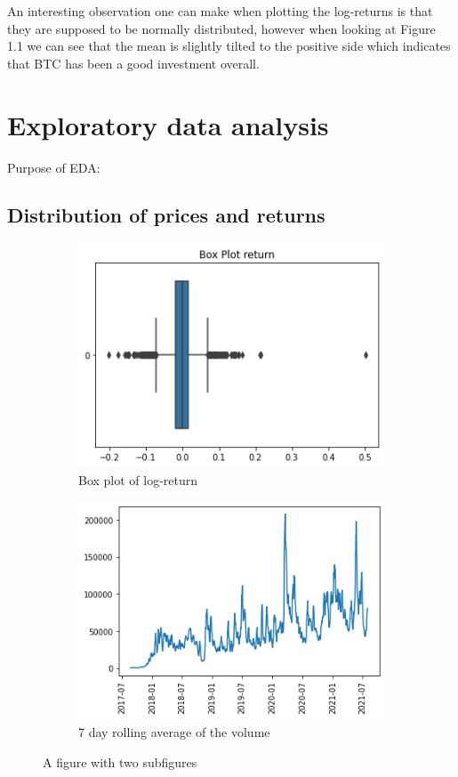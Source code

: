 \documentclass[twoside]{report}
\begin{document}
\begin{spacing}{1}
 An interesting observation one can make when plotting the log-returns is that they are supposed to be normally distributed, however when looking at Figure 1.1 we can see that the mean is slightly tilted to the positive side which indicates that BTC has been a good investment overall.
 
 
 \section{Exploratory data analysis}
Purpose of EDA:
\subsection{Distribution of prices and returns}



\begin{figure}
\centering
\begin{subfigure}{.5\textwidth}
    \centering
    \includegraphics[width=.9\linewidth]{Images/Box Plot of Return.png}
    \caption{Box plot of log-return}
    \label{log return box}
\end{subfigure}%
\begin{subfigure}{.5\textwidth}
    \centering
    \includegraphics[width=.9\linewidth]{Images/Volume Rolling Average.png}
    \caption{7 day rolling average of the volume}
    \label{7day rolling volume}
\end{subfigure}
\caption{A figure with two subfigures}
\label{fig:test}
\end{figure}



\end{spacing}
\end{document}
